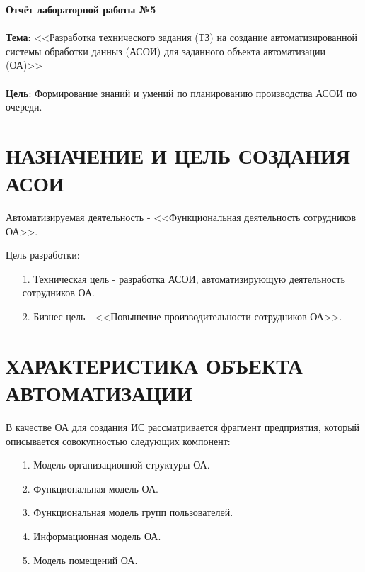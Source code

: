 \documentclass[12pt, a4paper, simple]{eskdtext}
\def \gpiDocNum {5}
\def \gpiTopicRep {Разработка технического задания (ТЗ) на создание
автоматизированной системы обработки данныз (АСОИ)
для заданного объекта автоматизации (ОА)}
\def \gpiDocTopic {Отчёт лабораторной работы №\gpiDocNum}
\begin{document}
    
    \thispagestyle{plain}
    \pagestyle{plain}

    \begin{center}
        \textbf{\gpiDocTopic}
    \end{center}

    \paragraph{} \textbf{Тема}: <<\gpiTopicRep>>

    \paragraph{} \textbf{Цель}:
    Формирование знаний и умений по планированию производства АСОИ по очереди.

    \section{НАЗНАЧЕНИЕ И ЦЕЛЬ СОЗДАНИЯ АСОИ}

    Автоматизируемая деятельность - <<Функциональная деятельность сотрудников ОА>>.

    Цель разработки:
    \begin{enumerate}
        \item[1.] Техническая цель - разработка АСОИ, автоматизирующую деятельность сотрудников ОА. 
        \item[2.] Бизнес-цель - <<Повышение производительности сотрудников ОА>>. 
    \end{enumerate}

    \section{ХАРАКТЕРИСТИКА ОБЪЕКТА АВТОМАТИЗАЦИИ}


    В качестве ОА для создания ИС рассматривается фрагмент предприятия,
    который описывается совокупностью следующих компонент:
    \begin{enumerate}
        \item[1.] Модель организационной структуры ОА.
        \item[2.] Функциональная модель ОА.
        \item[3.] Функциональная модель групп пользователей.
        \item[4.] Информационная модель ОА.
        \item[5.] Модель помещений ОА.
    \end{enumerate}
\end{document}
